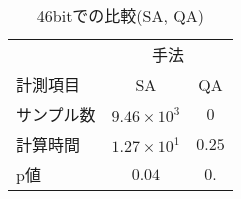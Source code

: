 
\begin{table}[hbtp]
	\caption{46bitでの比較(SA, QA)}
	\label{tb:46bit_SA_QA}
	\centering
	\begin{tabular}{lcc}
		\hline
		& \multicolumn{2}{c}{手法}\\
		計測項目& SA& QA\\
		\hline\hline
		サンプル数& $9.46\times 10^{3}$ & $0$ \\
		\hline
		計算時間 & $1.27\times 10^{1}$ & $0.25$ \\
		\hline
		p値 & $0.04$ & $0.$ \\
		\hline
	\end{tabular}
\end{table}